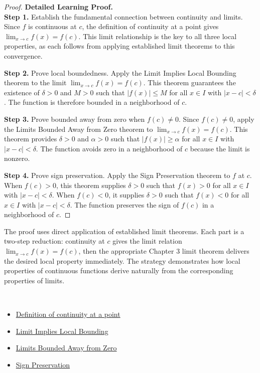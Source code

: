 \begin{proof}
\textbf{Detailed Learning Proof.}~\\

\textbf{Step 1.} Establish the fundamental connection between continuity and limits. Since $f$ is continuous at $c$, the definition of continuity at a point gives $\lim_{x \to c} f(x) = f(c)$. This limit relationship is the key to all three local properties, as each follows from applying established limit theorems to this convergence.

\textbf{Step 2.} Prove local boundedness. Apply the Limit Implies Local Bounding theorem to the limit $\lim_{x \to c} f(x) = f(c)$. This theorem guarantees the existence of $\delta > 0$ and $M > 0$ such that $|f(x)| \leq M$ for all $x \in I$ with $|x - c| < \delta$. The function is therefore bounded in a neighborhood of $c$.

\textbf{Step 3.} Prove bounded away from zero when $f(c) \neq 0$. Since $f(c) \neq 0$, apply the Limits Bounded Away from Zero theorem to $\lim_{x \to c} f(x) = f(c)$. This theorem provides $\delta > 0$ and $\alpha > 0$ such that $|f(x)| \geq \alpha$ for all $x \in I$ with $|x - c| < \delta$. The function avoids zero in a neighborhood of $c$ because the limit is nonzero.

\textbf{Step 4.} Prove sign preservation. Apply the Sign Preservation theorem to $f$ at $c$. When $f(c) > 0$, this theorem supplies $\delta > 0$ such that $f(x) > 0$ for all $x \in I$ with $|x - c| < \delta$. When $f(c) < 0$, it supplies $\delta > 0$ such that $f(x) < 0$ for all $x \in I$ with $|x - c| < \delta$. The function preserves the sign of $f(c)$ in a neighborhood of $c$.
\end{proof}

\begin{remark*}
The proof uses direct application of established limit theorems. Each part is a two-step reduction: continuity at $c$ gives the limit relation $\lim_{x \to c} f(x) = f(c)$, then the appropriate Chapter 3 limit theorem delivers the desired local property immediately. The strategy demonstrates how local properties of continuous functions derive naturally from the corresponding properties of limits.
\end{remark*}

\begin{remark*}[Dependencies]~\\
\begin{itemize}
  \item \hyperref[def:continuous-at-point]{Definition of continuity at a point}
  \item \hyperref[thm:limit-implies-local-bounding]{Limit Implies Local Bounding}
  \item \hyperref[thm:limit-quotient]{Limits Bounded Away from Zero}
  \item \hyperref[prop:sign-preservation]{Sign Preservation}
\end{itemize}
\end{remark*}
